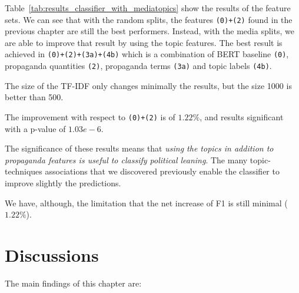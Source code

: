 Table~\ref{tab:results_classifier_with_mediatopics} show the results of the feature sets.
We can see that with the random splits, the features \texttt{(0)+(2)} found in the previous chapter are still the best performers.
Instead, with the media splits, we are able to improve that result by using the topic features.
The best result is achieved in \texttt{(0)+(2)+(3a)+(4b)} which is a combination of BERT baseline \texttt{(0)}, propaganda quantities \texttt{(2)}, propaganda terms \texttt{(3a)} and topic labels \texttt{(4b)}.

The size of the TF-IDF only changes minimally the results, but the size 1000 is better than 500.

The improvement with respect to \texttt{(0)+(2)} is of $1.22\%$, and results significant with a p-value of $1.03e-6$.

%

The significance of these results means that \emph{using the topics in addition to propaganda features is useful to classify political leaning}. The many topic-techniques associations that we discovered previously enable the classifier to improve slightly the predictions.

We have, although, the limitation that the net increase of F1 is still minimal ($1.22\%$).

\section{\statusgreen Discussions}
\label{sec:topic_discussion}

The main findings of this chapter are:

